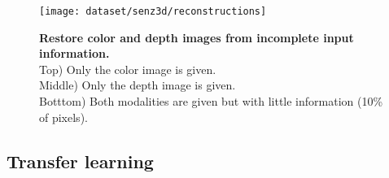 \begin{figure}[H]
  \centering
  \texttt{[image: dataset/senz3d/reconstructions]}\\[-1em]
  \caption{%
    \textbf{Restore color and depth images from incomplete input
      information.}\\[0.1em]
      Top) Only the color image is given.\\[0.1em]
      Middle) Only the depth image is given.\\[0.1em]
      Botttom) Both modalities are given but with little information
        (10\% of pixels).}
  \label{fig:color_depth_restoration}
\end{figure}

\subsection{Transfer learning}


\newpage

